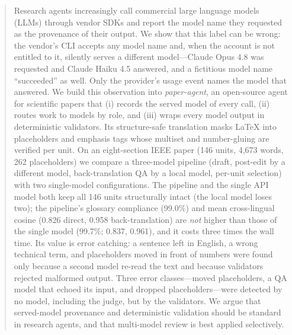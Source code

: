 \begin{abstract}
Research agents increasingly call commercial large language models (LLMs) through vendor SDKs and report the model name they requested as the provenance of their output. We show that this label can be wrong: the vendor's CLI accepts any model name and, when the account is not entitled to it, silently serves a different model---Claude Opus 4.8 was requested and Claude Haiku 4.5 answered, and a fictitious model name ``succeeded'' as well. Only the provider's usage event names the model that answered. We build this observation into \emph{paper-agent}, an open-source agent for scientific papers that (i) records the served model of every call, (ii) routes work to models by role, and (iii) wraps every model output in deterministic validators. Its structure-safe translation masks LaTeX into placeholders and emphasis tags whose multiset and number-gluing are verified per unit. On an eight-section IEEE paper (146 units, 4{,}673 words, 262 placeholders) we compare a three-model pipeline (draft, post-edit by a different model, back-translation QA by a local model, per-unit selection) with two single-model configurations. The pipeline and the single API model both keep all 146 units structurally intact (the local model loses two); the pipeline's glossary compliance (99.0\%) and mean cross-lingual cosine (0.826 direct, 0.958 back-translation) are \emph{not} higher than those of the single model (99.7\%; 0.837, 0.961), and it costs three times the wall time. Its value is error catching: a sentence left in English, a wrong technical term, and placeholders moved in front of numbers were found only because a second model re-read the text and because validators rejected malformed output. Three error classes---moved placeholders, a QA model that echoed its input, and dropped placeholders---were detected by no model, including the judge, but by the validators. We argue that served-model provenance and deterministic validation should be standard in research agents, and that multi-model review is best applied selectively.
\end{abstract}
